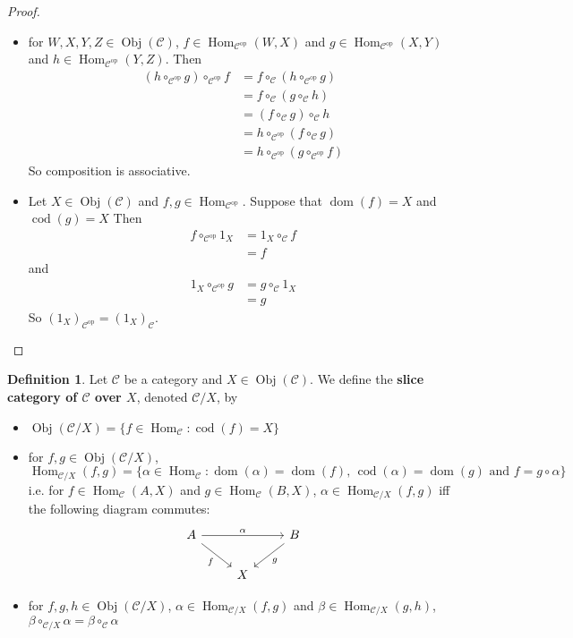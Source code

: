 \documentclass[12pt]{amsart}
\theoremstyle{definition}
\newtheorem{defn}[definition]{Definition}
\newcommand{\al}{\alpha}
\newcommand{\be}{\beta}
\newcommand{\MC}{\mathcal{C}}
\newcommand{\op}[1]{\mathcal{#1}^{\text{op}}}
\DeclareMathOperator{\dom}{dom}
\DeclareMathOperator{\cod}{cod}
\DeclareMathOperator{\Obj}{Obj}
\DeclareMathOperator{\Hom}{Hom}
\begin{document}
	\begin{proof}\
		\begin{itemize}
			\item for $W,X,Y,Z \in \Obj(\MC)$, $f \in \Hom_{\op{C}}(W, X)$ and $g \in \Hom_{\op{C}}(X, Y)$ and $h \in \Hom_{\op{C}}(Y, Z)$. Then 
			\begin{align*}
				(h \circ_{\op{C}} g) \circ_{\op{C}} f 
				&= f \circ_{\MC}( h \circ_{\op{C}} g) \\
				&= f \circ_{\MC} (g \circ_{\MC} h) \\
				&= (f \circ_{\MC} g) \circ_{\MC} h \\
				&= h \circ_{\op{C}} (f \circ_{\MC} g) \\
				&= h \circ_{\op{C}} (g \circ_{\op{C}} f)
			\end{align*}
			So composition is associative.
			\item Let $X \in \Obj(\MC)$ and $f,g \in \Hom_{\op{C}}$. Suppose that $\dom(f) = X$ and $\cod(g) = X$ 
			Then 
			\begin{align*}
				f  \circ_{\op{C}} 1_X
				&= 1_X  \circ_{\MC} f \\
				&= f
			\end{align*}
			and 
			\begin{align*}
				1_X  \circ_{\op{C}} g 
				&= g \circ_{\MC} 1_X \\
				&= g
			\end{align*}
		So $(1_X)_{\op{C}} =  (1_X)_{\MC}$.
		\end{itemize}
	\end{proof}
	
	\begin{defn}
		Let $\MC$ be a category and $X \in \Obj(\MC)$. We define the \textbf{slice category of $\MC$ over $X$}, denoted $\MC / X$, by
		\begin{itemize}
			\item $\Obj(\MC / X) = \{f \in \Hom_{\MC}: \cod(f) = X\}$
			\item for $f,g \in \Obj(\MC / X)$, 
			$$\Hom_{\MC / X}(f, g) = \{\al \in \Hom_{\MC} : \dom(\al) = \dom(f) \text{, } \cod(\al) = \dom(g) \text{ and } f = g \circ \al \}$$
			i.e. for $f \in \Hom_{\MC}(A, X)$ and $g \in \Hom_{\MC}(B, X)$, $\al \in \Hom_{\MC / X}(f, g)$ iff the following diagram commutes: 
			\[ \begin{tikzcd}
				A \arrow[rr, "\al"] \arrow[dr, "f"'] 	
				& & B  \arrow[dl, "g"] \\
				& X 
			\end{tikzcd}
			\]
			\item for $f,g, h \in \Obj(\MC / X)$, $\al \in \Hom_{\MC / X}(f, g)$ and $\be \in \Hom_{\MC / X}(g, h)$, $\be \circ_{\MC / X} \al = \be \circ_{\MC} \al$
		\end{itemize}
	\end{defn}
	
\end{document}
